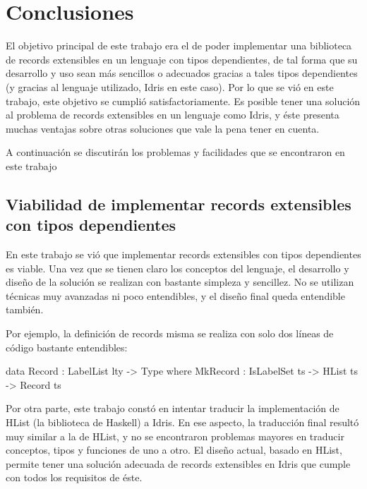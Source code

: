 
\chapter{Conclusiones}
\label{ch:5}

El objetivo principal de este trabajo era el de poder implementar una biblioteca de records extensibles en un lenguaje con tipos dependientes, de tal forma que su desarrollo y uso sean más sencillos o adecuados gracias a tales tipos dependientes (y gracias al lenguaje utilizado, Idris en este caso). Por lo que se vió en este trabajo, este objetivo se cumplió satisfactoriamente. Es posible tener una solución al problema de records extensibles en un lenguaje como Idris, y éste presenta muchas ventajas sobre otras soluciones que vale la pena tener en cuenta.

A continuación se discutirán los problemas y facilidades que se encontraron en este trabajo

\section{Viabilidad de implementar records extensibles con tipos dependientes}

En este trabajo se vió que implementar records extensibles con tipos dependientes es viable. Una vez que se tienen claro los conceptos del lenguaje, el desarrollo y diseño de la solución se realizan con bastante simpleza y sencillez. No se utilizan técnicas muy avanzadas ni poco entendibles, y el diseño final queda entendible también.

Por ejemplo, la definición de records misma se realiza con solo dos líneas de código bastante entendibles:

\begin{code}
data Record : LabelList lty -> Type where
  MkRecord : IsLabelSet ts -> HList ts -> Record ts
\end{code}

Por otra parte, este trabajo constó en intentar traducir la implementación de HList (la biblioteca de Haskell) a Idris. En ese aspecto, la traducción final resultó muy similar a la de HList, y no se encontraron problemas mayores en traducir conceptos, tipos y funciones de uno a otro. El diseño actual, basado en HList, permite tener una solución adecuada de records extensibles en Idris que cumple con todos los requisitos de éste.

